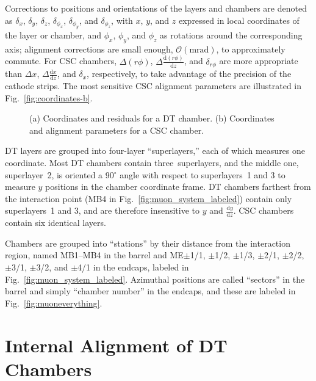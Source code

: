 \documentclass[11pt,twoside,a4paper,cmspaper]{cms-tdr}
\begin{document}
Corrections to positions and orientations of the layers and chambers
are denoted as $\delta_x$, $\delta_y$, $\delta_z$, $\delta_{\phi_x}$,
$\delta_{\phi_y}$, and $\delta_{\phi_z}$, with $x$, $y$, and $z$ expressed in
local coordinates of the layer or chamber, and $\phi_x$, $\phi_y$,
and $\phi_z$ as rotations around the corresponding axis; alignment
corrections are small enough, $\mathcal{O}(\mbox{mrad})$, to
approximately commute.  For CSC chambers, $\Delta(r\phi)$,
$\Delta \frac{\textrm{d}(r\phi)}{\textrm{d}z}$, and $\delta_{r\phi}$
are more appropriate than $\Delta x$,
$\Delta \frac{\textrm{d}x}{\textrm{d}z}$, and $\delta_x$,
respectively, to take advantage of the precision of the cathode
strips.  The most sensitive CSC alignment parameters are illustrated
in Fig.~\ref{fig:coordinates-b}.

\begin{figure}
\centering
{}
\hfill {}

\caption{(a) Coordinates and residuals for a DT chamber. (b) Coordinates and alignment parameters for a CSC chamber.}
\end{figure}

DT layers are grouped into four-layer ``superlayers,'' each of which
measures one coordinate.  Most DT chambers contain three~superlayers, and
the middle one, superlayer~2, is oriented a 90$^\circ$ angle with
respect to superlayers~1 and 3 to measure $y$ positions in the chamber
coordinate frame.  DT chambers farthest from the interaction point
(MB4 in Fig.~\ref{fig:muon_system_labeled}) contain only superlayers~1
and 3, and are therefore insensitive to $y$ and $\frac{\textrm{d}y}{\textrm{d}z}$.  CSC
chambers contain six identical layers.

Chambers are grouped into ``stations'' by their distance from the
interaction region, named MB1--MB4 in the barrel and ME$\pm$1/1,
$\pm$1/2, $\pm$1/3, $\pm$2/1, $\pm$2/2, $\pm$3/1, $\pm$3/2, and
$\pm$4/1 in the endcaps, labeled in
Fig.~\ref{fig:muon_system_labeled}.  Azimuthal positions are called
``sectors'' in the barrel and simply ``chamber number'' in the
endcaps, and these are labeled in Fig.~\ref{fig:muoneverything}.

\section{Internal Alignment of DT Chambers}
\label{sec:localdt}
\end{document}
